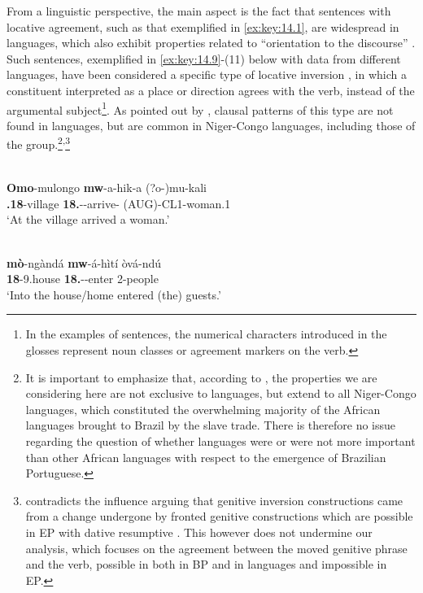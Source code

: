 \documentclass[output=paper]{langsci/langscibook}
\begin{document}
From a linguistic perspective, the main aspect is the fact that sentences with
locative agreement, such as that exemplified in \eqref{ex:key:14.1}, are widespread
in  languages, which also exhibit properties related to “orientation to
the discourse” \citep{Morimoto2006}. Such sentences, exemplified in
\eqref{ex:key:14.9}-(11) below with data from different  languages, have been
considered a specific type of locative inversion \citep{Salzmann2004}, in which
a constituent interpreted as a place or direction agrees with the verb, instead
of the argumental subject\footnote{In the examples of  sentences, the
numerical characters introduced in the glosses represent noun classes or
agreement markers on the verb.}. As pointed out by \citet{Baker2008}, clausal
patterns of this type are not found in  languages, but are common
in Niger-Congo languages, including those of the  group.\footnote{It is
    important to emphasize that, according to \citet{Baker2008}, the properties
    we are considering here are not exclusive to  languages, but extend to
    all Niger-Congo languages, which constituted the overwhelming majority of
    the African languages brought to Brazil by the slave trade. There is
    therefore no issue regarding the question of whether  languages were
    or were not more important than other African languages with respect to the
    emergence of Brazilian
    Portuguese.}\textsuperscript{,}\footnote{\textcite{Melo2014} contradicts
    the  influence arguing that genitive inversion constructions came from
    a change undergone by fronted genitive constructions which are possible in
    \gls{EP} with dative resumptive . This however does not undermine
    our analysis, which focuses on the agreement between the moved genitive
    phrase and the verb, possible in both in \gls{BP} and in  languages
and impossible in \gls{EP}.}

\ea\label{ex:key:14.9}  \parencite[119]{Baker2003}\\
    \gll    \textbf{Omo}-mulongo \textbf{mw}-a-hik-a (?o-)mu-kali\\
            \textbf{\Loc.18}-village \textbf{18.\Sm}-\Tns-arrive-\Fv{} (AUG)-CL1-woman.1\\
    \glt    ‘At the village arrived a woman.’\\
\z

\ea\label{ex:key:14.10}  \parencite[98]{Marten2006}\\
    \gll    \textbf{mò}-ngàndá \textbf{mw}-á-hìtí òvá-ndú\\
            \textbf{18}-9.house \textbf{18.\Sm}-\Pst-enter 2-people\\
    \glt    ‘Into the house/home entered (the) guests.’
\z
\end{document}

